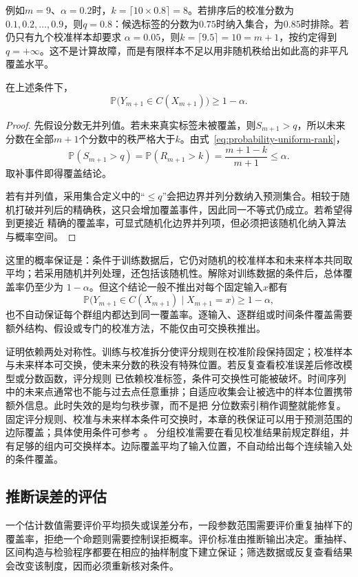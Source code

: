 例如\(m=9\)、\(\alpha=0.2\)时，\(k=\lceil10\times0.8\rceil=8\)。若排序后的校准分数为
\(0.1,0.2,\ldots,0.9\)，则\(q=0.8\)：候选标签的分数为\(0.75\)时纳入集合，为\(0.85\)时排除。若仍只有九个校准样本却要求
\(\alpha=0.05\)，则\(k=\lceil9.5\rceil=10=m+1\)，按约定得到\(q=+\infty\)。这不是计算故障，而是有限样本不足以用非随机秩给出如此高的非平凡覆盖水平。

\begin{theorem}[拆分共形的有限样本覆盖]
\label{thm:probability-split-conformal-coverage}
在上述条件下，
\[ \mathbb{P}\bigl(
    Y_{m+1}\in C(X_{m+1})\bigr)\geq 1-\alpha. \]
\end{theorem}

\begin{proof}
先假设分数无并列值。若未来真实标签未被覆盖，则\(S_{m+1}>q\)，所以未来分数在全部\(m+1\)个分数中的秩严格大于\(k\)。由式~\eqref{eq:probability-uniform-rank}，
\[ \mathbb{P}(S_{m+1}>q)
  =\mathbb{P}(R_{m+1}>k)=\frac{m+1-k}{m+1}\leq\alpha. \]
取补事件即得覆盖结论。

若有并列值，采用集合定义中的“\(\leq q\)”会把边界并列分数纳入预测集合。相较于随机打破并列后的精确秩，这只会增加覆盖事件，因此同一不等式仍成立。若希望得到更接近
精确的覆盖率，可显式随机化边界并列项，但必须把该随机化纳入算法与概率空间。
\end{proof}

这里的概率保证是：条件于训练数据后，它仍对随机的校准样本和未来样本共同取平均；若采用随机并列处理，还包括该随机性。解除对训练数据的条件后，总体覆盖率仍至少为
\(1-\alpha\)。但这个结论一般不推出对每个固定输入\(x\)都有
\[
  \mathbb{P}\bigl(
    Y_{m+1}\in C(X_{m+1})
    \mid X_{m+1}=x
  \bigr)
  \geq1-\alpha,
\]
也不自动保证每个群组内都达到同一覆盖率。逐输入、逐群组或时间条件覆盖需要额外结构、假设或专门的校准方法，不能仅由可交换秩推出。

证明依赖两处对称性。训练与校准拆分使评分规则在校准阶段保持固定；校准样本与未来样本可交换，使未来分数的秩没有特殊位置。若反复查看校准误差后修改模型或分数函数，评分规则
已依赖校准标签，条件可交换性可能被破坏。时间序列中的未来点通常也不能与过去点任意重排；自适应收集会让被选中的样本位置携带额外信息。此时失效的是均匀秩步骤，而不是把
分位数索引稍作调整就能修复。固定评分规则、校准与未来样本条件可交换时，本章的秩保证可以用于预测范围的边际覆盖；具体使用条件可参考
。
分组校准需要在看见校准结果前规定群组，并有足够的组内可交换样本。边际覆盖平均了输入位置，不自动给出每个连续输入处的条件覆盖。

\subsection{推断误差的评估}
\label{sec:stats-uncertainty-testing-selection}
一个估计数值需要评价平均损失或误差分布，一段参数范围需要评价重复抽样下的覆盖率，拒绝一个命题则需要控制误拒概率。评价标准由推断输出决定。重抽样、区间构造与检验程序都要在相应的抽样制度下建立保证；筛选数据或反复查看结果会改变该制度，因而必须重新核对条件。

